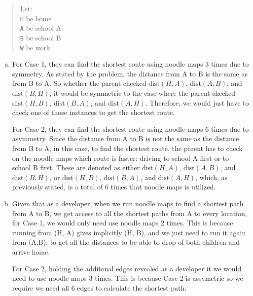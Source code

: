 \documentclass[letterpaper,11pt]{article}
\theoremstyle{plain}
\theoremstyle{definition}
\begin{document}
\newpage
{}
{\color{blue}


\begin{quote}
    Let: \\
    \texttt{H} be home \\
    \texttt{A} be school A \\
    \texttt{B} be school B \\
    \texttt{W} be work
    \end{quote}

\begin{enumerate}[a)]

    \item
        For Case 1, they can find the shortest route using noodle maps 3 times due to symmetry. As stated by the problem, the distance from A to B is the same as from B to A. So whether the parent checked $\text{dist}(H, A)$, $\text{dist}(A, B)$, and $\text{dist}(B, H)$, it would be symmetric to the case where the parent checked $\text{dist}(H, B)$, $\text{dist}(B, A)$, and $\text{dist}(A, H)$. Therefore, we would just have to check one of those instances to get the shortest route. 

        For Case 2, they can find the shortest route using noodle maps 6 times due to asymmetry. Since the distance from A to B is not the same as the distance from B to A, in this case, to find the shortest route, the parent has to check on the noodle maps which route is faster: driving to school A first or to school B first. These are denoted as either $\text{dist}(H, A)$, $\text{dist}(A, B)$, and $\text{dist}(B, H)$, or $\text{dist}(H, B)$, $\text{dist}(B, A)$, and $\text{dist}(A, H)$, which, as previously stated, is a total of 6 times that noodle maps is utilized.

    \item  
        Given that as a developer, when we run noodle maps to find a shortest path from A to B, we get access to all the shortest paths from A to every location, for Case 1, we would only need use noodle maps 2 times. This is because running from (H, A) gives implicitly (H, B), and we just need to run it again from (A,B), to get all the distances to be able to drop of both children and arrive home. 
        
        For Case 2, holding the additonal edges revealed as a developer it we would need to use noodle maps 3 times. This is because Case 2 is assymetric so we require  we need all 6 edges to calculate the shortest path:
        

\end{enumerate}}
\end{document}
